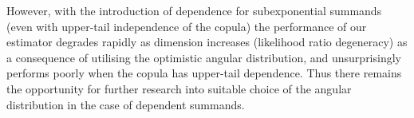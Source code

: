 However, with the introduction of dependence for subexponential summands (even with upper-tail independence of the copula) the performance of our estimator
degrades rapidly as dimension increases (likelihood ratio degeneracy) as a consequence of utilising the optimistic angular distribution, and
unsurprisingly performs poorly when the copula has upper-tail dependence.
Thus there remains the opportunity for further research into suitable choice of the angular distribution in the case of dependent summands.